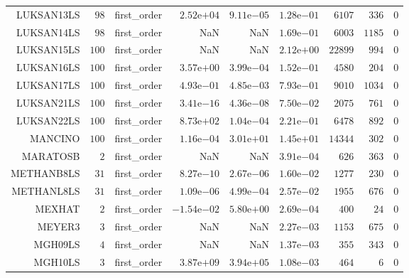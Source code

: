\begin{longtable}{rrrrrrrrr}
LUKSAN13LS & \(    98\) & first\_order & \( 2.52\)e\(+04\) & \( 9.11\)e\(-05\) & \( 1.28\)e\(-01\) & \(  6107\) & \(   336\) & \(     0\) \\
LUKSAN14LS & \(    98\) & first\_order &       NaN &       NaN & \( 1.69\)e\(-01\) & \(  6003\) & \(  1185\) & \(     0\) \\
LUKSAN15LS & \(   100\) & first\_order &       NaN &       NaN & \( 2.12\)e\(+00\) & \( 22899\) & \(   994\) & \(     0\) \\
LUKSAN16LS & \(   100\) & first\_order & \( 3.57\)e\(+00\) & \( 3.99\)e\(-04\) & \( 1.52\)e\(-01\) & \(  4580\) & \(   204\) & \(     0\) \\
LUKSAN17LS & \(   100\) & first\_order & \( 4.93\)e\(-01\) & \( 4.85\)e\(-03\) & \( 7.93\)e\(-01\) & \(  9010\) & \(  1034\) & \(     0\) \\
LUKSAN21LS & \(   100\) & first\_order & \( 3.41\)e\(-16\) & \( 4.36\)e\(-08\) & \( 7.50\)e\(-02\) & \(  2075\) & \(   761\) & \(     0\) \\
LUKSAN22LS & \(   100\) & first\_order & \( 8.73\)e\(+02\) & \( 1.04\)e\(-04\) & \( 2.21\)e\(-01\) & \(  6478\) & \(   892\) & \(     0\) \\
MANCINO & \(   100\) & first\_order & \( 1.16\)e\(-04\) & \( 3.01\)e\(+01\) & \( 1.45\)e\(+01\) & \( 14344\) & \(   302\) & \(     0\) \\
MARATOSB & \(     2\) & first\_order &       NaN &       NaN & \( 3.91\)e\(-04\) & \(   626\) & \(   363\) & \(     0\) \\
METHANB8LS & \(    31\) & first\_order & \( 8.27\)e\(-10\) & \( 2.67\)e\(-06\) & \( 1.60\)e\(-02\) & \(  1277\) & \(   230\) & \(     0\) \\
METHANL8LS & \(    31\) & first\_order & \( 1.09\)e\(-06\) & \( 4.99\)e\(-04\) & \( 2.57\)e\(-02\) & \(  1955\) & \(   676\) & \(     0\) \\
MEXHAT & \(     2\) & first\_order & \(-1.54\)e\(-02\) & \( 5.80\)e\(+00\) & \( 2.69\)e\(-04\) & \(   400\) & \(    24\) & \(     0\) \\
MEYER3 & \(     3\) & first\_order &       NaN &       NaN & \( 2.27\)e\(-03\) & \(  1153\) & \(   675\) & \(     0\) \\
MGH09LS & \(     4\) & first\_order &       NaN &       NaN & \( 1.37\)e\(-03\) & \(   355\) & \(   343\) & \(     0\) \\
MGH10LS & \(     3\) & first\_order & \( 3.87\)e\(+09\) & \( 3.94\)e\(+05\) & \( 1.08\)e\(-03\) & \(   464\) & \(     6\) & \(     0\) \\

\end{longtable}
